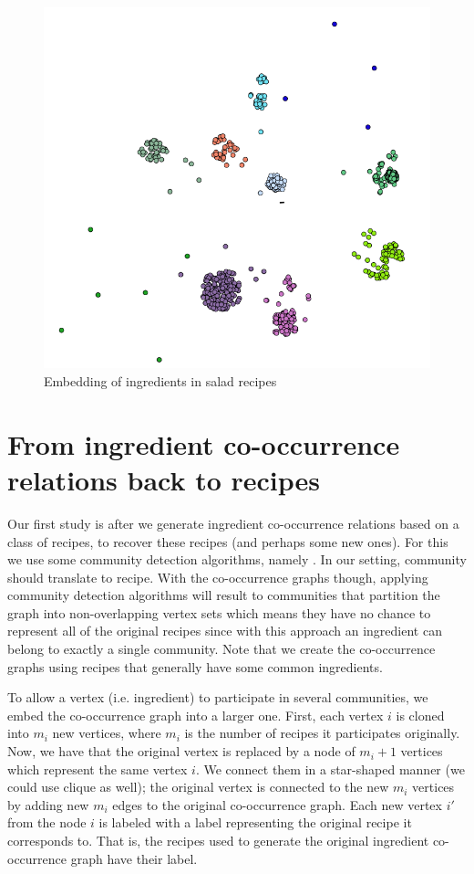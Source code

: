 \documentclass[conference]{IEEEtran}
\begin{document}
  \begin{figure}[h!]
	\centering
	\includegraphics[width=0.8\linewidth]{salads.png}
	\caption[Embedding of ingredients in salad recipes]{Embedding of ingredients in salad recipes}
	\label{fig:P2compileP0-1}
  \end{figure}


\section{From ingredient co-occurrence relations back to recipes}
Our first study is after we generate ingredient co-occurrence relations based on a class of recipes, to recover these recipes (and perhaps some new ones).
For this we use some community detection algorithms, namely \cite{blondel08}. In our setting, community should translate to recipe. With the 
co-occurrence graphs though, applying  community detection  algorithms will result to communities that partition the graph into non-overlapping vertex
sets which means they have no chance to represent all of the original recipes  since with this approach an ingredient can belong to exactly a  single community.
Note that we create the co-occurrence graphs using recipes that generally have  some common ingredients. 

To allow a vertex (i.e. ingredient) to participate in several communities, we embed the co-occurrence graph into a larger one.
First, each vertex $i$ is cloned into $m_i$ new vertices, where $m_i$ is the number of recipes it  participates  originally. 
Now, we have that the original vertex is replaced by a node of $m_i+1$ vertices which represent the same vertex $i$.
We connect them in a star-shaped manner (we could use clique as well); the original vertex is connected to the new $m_i$ vertices
by adding new $m_i$ edges to the original co-occurrence graph.  Each new vertex $i{'}$ from the node $i$ is labeled with a label
representing the original recipe it corresponds to.  That is, the  recipes used to generate the original ingredient co-occurrence graph have their label. 
\end{document}

